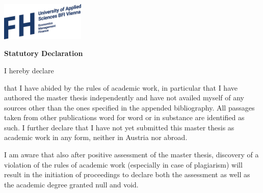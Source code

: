 

\begin{flushright}
\includegraphics[width=0.3\textwidth]{figures/FHlogo2.jpeg}\par
\end{flushright}

\vspace{1.5cm}
	
\begin{center}
\fontsize{18}{21.6}\selectfont
\textbf{Statutory Declaration}
\end{center}

\vspace{1cm}

I hereby declare

that I have abided by the rules of academic work, in particular that I have authored the master thesis independently and have not availed myself of any sources other than the ones specified in the appended bibliography. All passages taken from other publications word for word or in substance are identified as such. I further declare that I have not yet submitted this master thesis as academic work in any form, neither in Austria nor abroad.

I am aware that also after positive assessment of the master thesis, discovery of a violation of the rules of academic work (especially in case of plagiarism) will result in the initiation of proceedings to declare both the assessment as well as the academic degree granted null and void.

\signature{Place, Date}{}\hfill{}